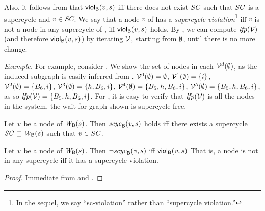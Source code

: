 Also, it follows from  that $\mathsf{viol}_{\mathsf{B}}(v,s)$ iff there does not exist $\mathit{SC}$ such that $\mathit{SC}$ is a supercycle and $v \in SC$.
We say that a node $v$ of  has a \emph{supercycle violation}\footnote{In the sequel, we say ``sc-violation'' rather than ``supercycle violation.''} iff $v$ is not a node in any supercycle of , 
\ie iff $\mathsf{viol}_{\mathsf{B}}(v,s)$ holds. 
By , we can compute $\mathit{lfp}(\mathcal{V})$ (and therefore $\mathsf{viol}_{\mathsf{B}}(v,s)$) by iterating $\mathcal{V}$, starting from $\emptyset$, until there is no more change.

\vspace{1ex}
\textit{Example.} 
For example, consider . We show the set of nodes in each $\mathcal{V}^{d} (\emptyset)$, as the induced subgraph is easily inferred from .
$\mathcal{V}^{0} (\emptyset) = \emptyset$,
$\mathcal{V}^{1} (\emptyset) = \{ i \}$, 
$\mathcal{V}^{2} (\emptyset) = \{ B_6, i \}$, 
$\mathcal{V}^{3} (\emptyset) = \{ h, B_6, i \}$, 
$\mathcal{V}^{4} (\emptyset) = \{ B_5, h, B_6, i \}$, 
$\mathcal{V}^{5} (\emptyset) = \{ B_5, h, B_6, i \}$, 
as so $\mathit{lfp}(\mathcal{V}) = \{ B_5, h, B_6, i \}$.
%
For , it is easy to verify that $\mathit{lfp}(\mathcal{V})$ is all the nodes in the system, \ie the wait-for graph shown is supercycle-free.




\begin{definition}
\label{defn:supercycle.membership}
Let $\mathit{v}$ be a node of $\mathit{W}_{\mathsf{B}}({s})$. Then $\mathit{scyc}_{\mathsf{B}}({\mathit{v}, s})$ holds iff there exists a supercycle $\mathit{SC} \sqsubseteq \mathit{W}_{\mathsf{B}}({s})$ such that
$\mathit{v} \in \mathit{SC}$.
\end{definition}





\begin{proposition} \label{prop:scViol-iff-notInSC}
Let $\mathit{v}$ be a node of $\mathit{W}_{\mathsf{B}}({s})$. Then $\neg \mathit{scyc}_{\mathsf{B}}({\mathit{v}, s})$ iff $\mathsf{viol}_{\mathsf{B}}(\mathit{v},s)$ %
That is, a node is not in any supercycle iff it has a supercycle violation.
\end{proposition}
%
\begin{proof}
Immediate from  and .
\end{proof}








